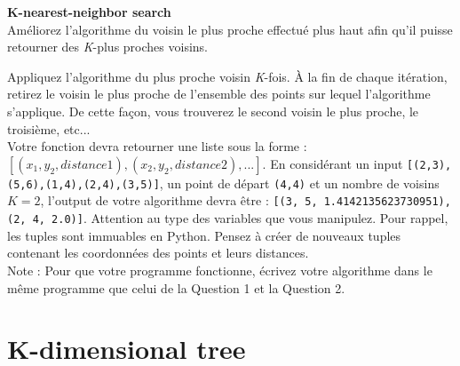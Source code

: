 \begin{Exercice}[15 minutes]\textbf{K-nearest-neighbor search}\\


Améliorez l'algorithme du voisin le plus proche effectué plus haut afin qu'il puisse retourner des \textit{K}-plus proches voisins.\\

\begin{conseil}
Appliquez l'algorithme du plus proche voisin \textit{K}-fois. À la fin de chaque itération, retirez le voisin le plus proche de l'ensemble des points sur lequel l'algorithme s'applique. De cette façon, vous trouverez le second voisin le plus proche, le troisième, etc...\\

Votre fonction devra retourner une liste sous la forme : $[(x_1,y_2, distance1),(x_2,y_2,distance2),...]$. En considérant un input \lstinline{[(2,3),(5,6),(1,4),(2,4),(3,5)]}, un point de départ \lstinline{(4,4)} et un nombre de voisins $K=2$, l'output de votre algorithme devra être : \lstinline{[(3, 5, 1.4142135623730951), (2, 4, 2.0)]}. Attention au type des variables que vous manipulez. Pour rappel, les tuples sont immuables en Python. Pensez à créer de nouveaux tuples contenant les coordonnées des points et leurs distances.\\

Note : Pour que votre programme fonctionne, écrivez votre algorithme dans le même programme que celui de la Question 1 et la Question 2.
\end{conseil}

\begin{solution}
    
\end{solution}
\end{Exercice}
\newpage
\section{K-dimensional tree}

